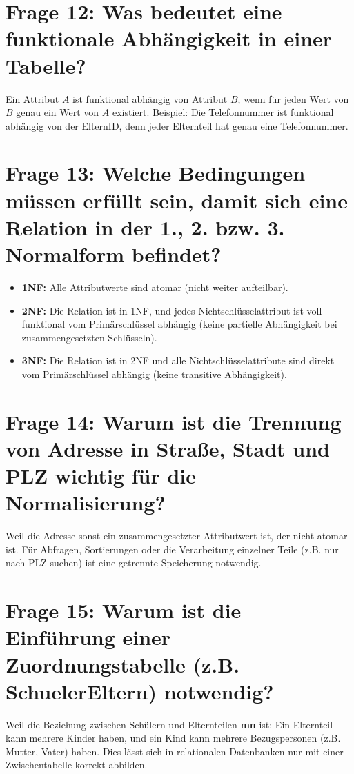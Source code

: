 \documentclass{article}
\begin{document}
\section*{Frage 12: Was bedeutet eine funktionale Abhängigkeit in einer Tabelle?}

	Ein Attribut $A$ ist funktional abhängig von Attribut $B$, wenn für jeden Wert von $B$ genau ein Wert von $A$ existiert. Beispiel: Die Telefonnummer ist funktional abhängig von der ElternID, denn jeder Elternteil hat genau eine Telefonnummer.
	
\section*{Frage 13: Welche Bedingungen müssen erfüllt sein, damit sich eine Relation in der 1., 2. bzw. 3. Normalform befindet?}

	\begin{itemize}
	\item \textbf{1NF:} Alle Attributwerte sind atomar (nicht weiter aufteilbar).
	\item \textbf{2NF:} Die Relation ist in 1NF, und jedes Nichtschlüsselattribut ist voll funktional vom Primärschlüssel abhängig (keine partielle Abhängigkeit bei zusammengesetzten Schlüsseln).
	\item \textbf{3NF:} Die Relation ist in 2NF und alle Nichtschlüsselattribute sind direkt vom Primärschlüssel abhängig (keine transitive Abhängigkeit).
\end{itemize}

\section*{Frage 14: Warum ist die Trennung von Adresse in Straße, Stadt und PLZ wichtig für die Normalisierung?}

	Weil die Adresse sonst ein zusammengesetzter Attributwert ist, der nicht atomar ist. Für Abfragen, Sortierungen oder die Verarbeitung einzelner Teile (z.B. nur nach PLZ suchen) ist eine getrennte Speicherung notwendig.
	
\section*{Frage 15: Warum ist die Einführung einer Zuordnungstabelle (z.B. SchuelerEltern) notwendig?}

	Weil die Beziehung zwischen Schülern und Elternteilen \textbf{m\:n} ist: Ein Elternteil kann mehrere Kinder haben, und ein Kind kann mehrere Bezugspersonen (z.B. Mutter, Vater) haben. Dies lässt sich in relationalen Datenbanken nur mit einer Zwischentabelle korrekt abbilden.
	
\end{document}
